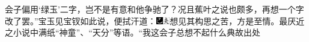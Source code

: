 会子偏用‘绿玉’二字，岂不是有意和他争驰了？况且蕉叶之说也颇多，再想一个字改了罢。”宝玉见宝钗如此说，便拭汗道：{\includegraphics[width=3mm]{../Images/00003}\includegraphics[width=3mm]{../Images/00012}\footnotesize \kaishu 想见其构思之苦，方是至情。最厌近之小说中满纸“神童”、“天分”等语。}“我这会子总想不起什么典故出处